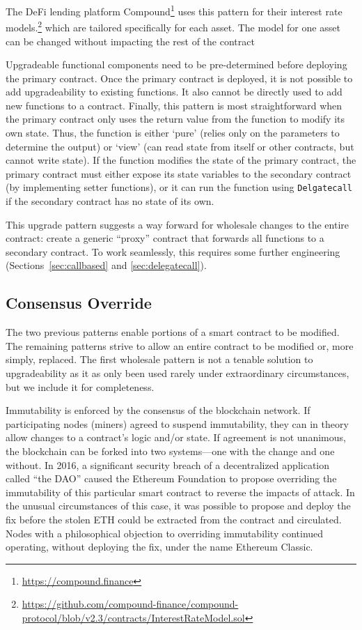 The DeFi lending platform Compound\footnote{\url{https://compound.finance}} uses this pattern for their interest rate models.\footnote{\url{https://github.com/compound-finance/compound-protocol/blob/v2.3/contracts/InterestRateModel.sol}} which are tailored specifically for each asset. The model for one asset can be changed without impacting the rest of the contract~\cite{openzeppelinPost}

Upgradeable functional components need to be pre-determined before deploying the primary contract. Once the primary contract is deployed, it is not possible to add upgradeability to existing functions. It also cannot be directly used to add new functions to a contract. Finally, this pattern is most straightforward when the primary contract only uses the return value from the function to modify its own state. Thus, the function is either `pure' (relies only on the parameters to determine the output) or `view' (can read state from itself or other contracts, but cannot write state). If the function modifies the state of the primary contract, the primary contract must either expose its state variables to the secondary contract (by implementing setter functions), or it can run the function using \texttt{Delgatecall} if the secondary contract has no state of its own. 

This upgrade pattern suggests a way forward for wholesale changes to the entire contract: create a generic ``proxy'' contract that forwards all functions to a secondary contract. To work seamlessly, this requires some further engineering (Sections~\ref{sec:callbased} and \ref{sec:delegatecall}).


\subsection{Consensus Override}
\label{sec:hardfork}

The two previous patterns enable portions of a smart contract to be modified. The remaining patterns strive to allow an entire contract to be modified or, more simply, replaced. The first wholesale pattern is not a tenable solution to upgradeability as it as only been used rarely under extraordinary circumstances, but we include it for completeness. 

Immutability is enforced by the consensus of the blockchain network. If participating nodes (\eg miners) agreed to suspend immutability, they can in theory allow changes to a contract's logic and/or state. If agreement is not unanimous, the blockchain can be forked into two systems---one with the change and one without. In 2016, a significant security breach of a decentralized application called ``the DAO'' caused the Ethereum Foundation to propose overriding the immutability of this particular smart contract to reverse the impacts of attack. In the unusual circumstances of this case, it was possible to propose and deploy the fix before the stolen ETH could be extracted from the contract and circulated. Nodes with a philosophical objection to overriding immutability continued operating, without deploying the fix, under the name Ethereum Classic.

